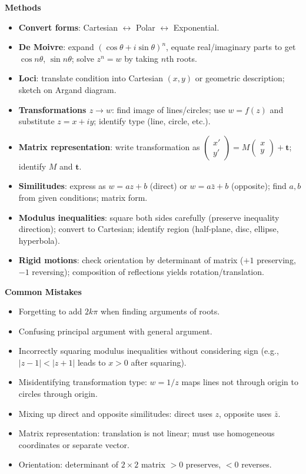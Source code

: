 \documentclass[11pt]{article}
\begin{document}
\begin{bilan}
\textbf{Methods}
\begin{itemize}
\item \textbf{Convert forms}: Cartesian $\leftrightarrow$ Polar $\leftrightarrow$ Exponential.
\item \textbf{De Moivre}: expand $(\cos\theta+i\sin\theta)^n$, equate real/imaginary parts to get $\cos n\theta$, $\sin n\theta$; solve $z^n = w$ by taking $n$th roots.
\item \textbf{Loci}: translate condition into Cartesian $(x,y)$ or geometric description; sketch on Argand diagram.
\item \textbf{Transformations $z\to w$}: find image of lines/circles; use $w=f(z)$ and substitute $z=x+iy$; identify type (line, circle, etc.).
\item \textbf{Matrix representation}: write transformation as $\begin{pmatrix}x'\\y'\end{pmatrix}=M\begin{pmatrix}x\\y\end{pmatrix}+\mathbf{t}$; identify $M$ and $\mathbf{t}$.
\item \textbf{Similitudes}: express as $w=az+b$ (direct) or $w=a\bar{z}+b$ (opposite); find $a,b$ from given conditions; matrix form.
\item \textbf{Modulus inequalities}: square both sides carefully (preserve inequality direction); convert to Cartesian; identify region (half-plane, disc, ellipse, hyperbola).
\item \textbf{Rigid motions}: check orientation by determinant of matrix ($+1$ preserving, $-1$ reversing); composition of reflections yields rotation/translation.
\end{itemize}

\textbf{Common Mistakes}
\begin{itemize}
\item Forgetting to add $2k\pi$ when finding arguments of roots.
\item Confusing principal argument with general argument.
\item Incorrectly squaring modulus inequalities without considering sign (e.g., $|z-1|<|z+1|$ leads to $x>0$ after squaring).
\item Misidentifying transformation type: $w=1/z$ maps lines not through origin to circles through origin.
\item Mixing up direct and opposite similitudes: direct uses $z$, opposite uses $\bar{z}$.
\item Matrix representation: translation is not linear; must use homogeneous coordinates or separate vector.
\item Orientation: determinant of $2\times2$ matrix $>0$ preserves, $<0$ reverses.
\end{itemize}


\end{bilan}
\end{document}
